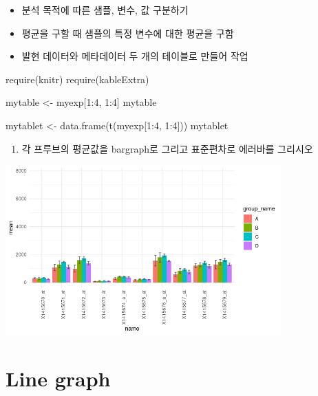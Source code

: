 \documentclass[
]{book}
\newenvironment{Shaded}{\begin{snugshade}}{\end{snugshade}}
\newcommand{\DecValTok}[1]{\textcolor[rgb]{0.00,0.00,0.81}{#1}}
\newcommand{\FunctionTok}[1]{\textcolor[rgb]{0.00,0.00,0.00}{#1}}
\newcommand{\NormalTok}[1]{#1}
\newcommand{\OtherTok}[1]{\textcolor[rgb]{0.56,0.35,0.01}{#1}}
\newcommand{\SpecialCharTok}[1]{\textcolor[rgb]{0.00,0.00,0.00}{#1}}
\providecommand{\tightlist}{%
  \setlength{\itemsep}{0pt}\setlength{\parskip}{0pt}}
\begin{document}
\begin{itemize}
\tightlist
\item
  분석 목적에 따른 샘플, 변수, 값 구분하기
\item
  평균을 구할 때 샘플의 특정 변수에 대한 평균을 구함
\item
  발현 데이터와 메타데이터 두 개의 테이블로 만들어 작업
\end{itemize}

\begin{Shaded}
\begin{Highlighting}[]
\FunctionTok{require}\NormalTok{(knitr)}
\FunctionTok{require}\NormalTok{(kableExtra)}

\NormalTok{mytable }\OtherTok{\textless{}{-}}\NormalTok{ myexp[}\DecValTok{1}\SpecialCharTok{:}\DecValTok{4}\NormalTok{, }\DecValTok{1}\SpecialCharTok{:}\DecValTok{4}\NormalTok{]}
\NormalTok{mytable }

\NormalTok{mytablet }\OtherTok{\textless{}{-}} \FunctionTok{data.frame}\NormalTok{(}\FunctionTok{t}\NormalTok{(myexp[}\DecValTok{1}\SpecialCharTok{:}\DecValTok{4}\NormalTok{, }\DecValTok{1}\SpecialCharTok{:}\DecValTok{4}\NormalTok{]))}
\NormalTok{mytablet }
\end{Highlighting}
\end{Shaded}

\begin{enumerate}
\def\labelenumi{\arabic{enumi}.}
\setcounter{enumi}{3}
\tightlist
\item
  각 프루브의 평균값을 bargraph로 그리고 표준편차로 에러바를 그리시오
\end{enumerate}

\includegraphics[width=4.16667in,height=\textheight]{images/07/barploterrorbar.png}

\hypertarget{line-graph}{%
\section{Line graph}\label{line-graph}}
\end{document}
